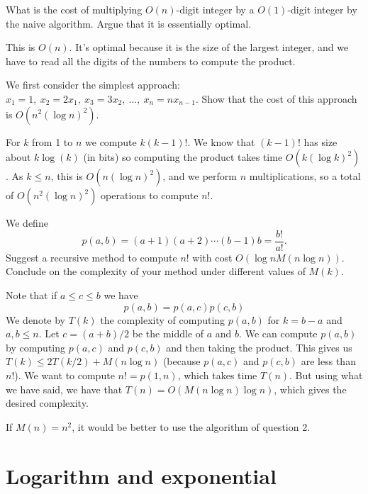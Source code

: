 \documentclass[11pt]{exam}
\theoremstyle{definition}
\begin{document}
\begin{questions}

\question What is the cost of multiplying $O(n)$-digit integer by a $O(1)$-digit integer by the naive algorithm. Argue that it is essentially optimal.
\begin{solution}
This is $O(n)$. It's optimal because it is the size of the largest integer, and we have to read all the digits of the numbers to compute the product.
\end{solution}

\question
We first consider the simplest approach:
$x_1=1,\ x_2=2x_1,\ x_3=3x_2,\ \ldots,\ x_n=nx_{n-1}.$  Show that the cost of this approach is $O(n^2 (\log n)^2)$.

\begin{solution}
For $k$ from 1 to $n$ we compute $k (k-1)!$. We know that $(k-1)!$ has size about $k\log(k)$ (in bits) so computing the product takes time $O(k (\log k)^2)$. As $k \leq n$, this is $O(n (\log n)^2)$, and we perform $n$ multiplications, so a total of $O(n^2 (\log n)^2)$ operations to compute $n!$.
\end{solution}

\question
We define $$p(a,b)=(a+1)(a+2)\cdots (b-1)b=\frac{b!}{a!}.$$
Suggest a recursive method to compute $n!$ with cost $O(\log n M(n\log n))$. 
Conclude on the complexity of your method under different values of $M(k)$.
\begin{solution}
Note that if $a \leq c \leq b$ we have
$$p(a,b) = p(a,c) p(c,b)$$
We denote by $T(k)$ the complexity of computing $p(a,b)$ for $k = b-a$ and $a,b \leq n$. Let $c = (a+b)/2$ be the middle of $a$ and $b$. We can compute $p(a,b)$ by computing $p(a,c)$ and $p(c,b)$ and then taking the product. This gives us $T(k) \leq 2 T(k/2) + M(n \log n)$ (because $p(a,c)$ and $p(c,b)$ are less than $n!$).
We want to compute $n! = p(1,n)$, which takes time $T(n)$. But using what we have said, we have that $T(n) = O(M(n \log n) \log n)$, which gives the desired complexity.

If $M(n) = n^2$, it would be better to use the algorithm of question 2.
\end{solution}
\end{questions}

\section{Logarithm and exponential}
\end{document}
